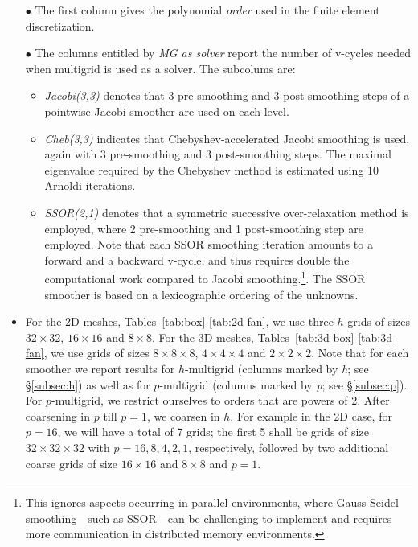 \documentclass[smallcondensed,final]{svjour3}     %
\begin{document}
\begin{itemize}
\item[$\bullet$] The first column gives the polynomial \emph{order}
  used in the finite element discretization.
\item[$\bullet$] The columns entitled by \emph{MG as solver} report
  the number of v-cycles needed when multigrid is used as a
  solver. The subcolums are:
  \begin{itemize}
  \item \emph{Jacobi(3,3)} denotes that 3 pre-smoothing and 3
    post-smoothing steps of a pointwise Jacobi smoother are used on
    each level.
  \item \emph{Cheb(3,3)} indicates that Chebyshev-accelerated Jacobi
    smoothing is used, again with 3 pre-smoothing and 3
    post-smoothing steps. The maximal eigenvalue required by the
    Chebyshev method is estimated using 10 Arnoldi iterations.
  \item \emph{SSOR(2,1)} denotes that a symmetric successive
    over-relaxation method is employed, where 2 pre-smoothing and 1
    post-smoothing step are employed. Note that each SSOR smoothing
    iteration amounts to a forward and a backward v-cycle, and thus
    requires double the computational work compared to Jacobi
    smoothing.\footnote{This ignores aspects occurring in parallel
      environments, where Gauss-Seidel smoothing---such as SSOR---can
      be challenging to implement and requires more communication in
      distributed memory environments.}. The SSOR smoother is based on 
			a lexicographic ordering of  the unknowns. 
  \end{itemize}
  \item For the 2D meshes, Tables~\ref{tab:box}-\ref{tab:2d-fan}, we use 
  three $h$-grids of sizes $32\times32$, $16\times16$ and $8\times8$. For 
  the 3D meshes, Tables~\ref{tab:3d-box}-\ref{tab:3d-fan}, we use grids of 
  sizes $8\times8\times8$, $4\times4\times4$ and $2\times2\times2$.
  Note that for each smoother we report results for
  $h$-multigrid (columns marked by \emph{h}; see
  \S\ref{subsec:h}) as well as for $p$-multigrid (columns marked
  by \emph{p}; see \S\ref{subsec:p}). For $p$-multigrid, we
  restrict ourselves to orders that are powers of 2. After
  coarsening in $p$ till $p=1$, we coarsen in $h$. For example in the 2D case, 
  for $p=16$, we will have a total of 7 grids; the first 5 shall be grids of 
  size $32\times32\times32$ with $p=16,8,4,2,1$, respectively, followed by 
  two additional coarse grids of size $16\times16$ and $8\times8$ and $p=1$.

\end{itemize}
\end{document}
